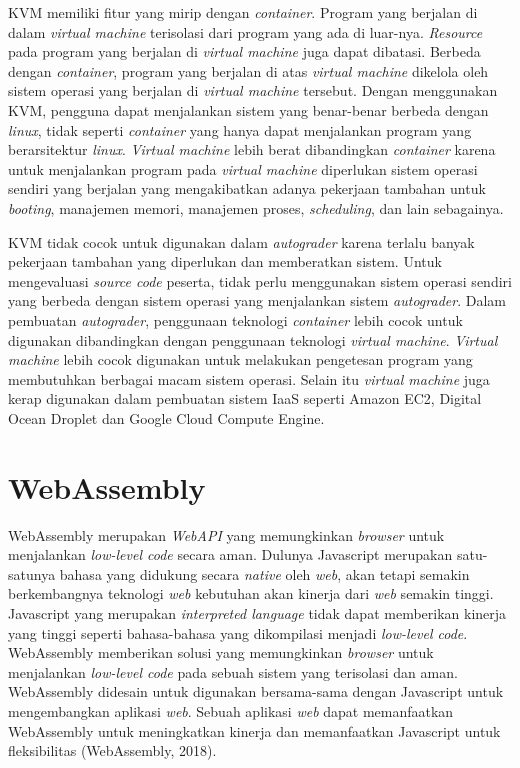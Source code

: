 \par KVM memiliki fitur yang mirip dengan \textit{container}. Program yang berjalan di dalam \textit{virtual machine} terisolasi dari program yang ada di luar-nya. \textit{Resource} pada program yang berjalan di \textit{virtual machine} juga dapat dibatasi. Berbeda dengan \textit{container}, program yang berjalan di atas \textit{virtual machine} dikelola oleh sistem operasi yang berjalan di \textit{virtual machine} tersebut. Dengan menggunakan KVM, pengguna dapat menjalankan sistem yang benar-benar berbeda dengan \textit{linux}, tidak seperti \textit{container} yang hanya dapat menjalankan program yang berarsitektur \textit{linux}. \textit{Virtual machine} lebih berat dibandingkan \textit{container} karena untuk menjalankan program pada \textit{virtual machine} diperlukan sistem operasi sendiri yang berjalan yang mengakibatkan adanya pekerjaan tambahan untuk \textit{booting}, manajemen memori, manajemen proses, \textit{scheduling}, dan lain sebagainya.

\par KVM tidak cocok untuk digunakan dalam \textit{autograder} karena terlalu banyak pekerjaan tambahan yang diperlukan dan memberatkan sistem. Untuk mengevaluasi \textit{source code} peserta, tidak perlu menggunakan sistem operasi sendiri yang berbeda dengan sistem operasi yang menjalankan sistem \textit{autograder}. Dalam pembuatan \textit{autograder}, penggunaan teknologi \textit{container} lebih cocok untuk digunakan dibandingkan dengan penggunaan teknologi \textit{virtual machine}. \textit{Virtual machine} lebih cocok digunakan untuk melakukan pengetesan program yang membutuhkan berbagai macam sistem operasi. Selain itu \textit{virtual machine} juga kerap digunakan dalam pembuatan sistem IaaS seperti Amazon EC2, Digital Ocean Droplet dan Google Cloud Compute Engine.

\section{WebAssembly}

\par WebAssembly merupakan \textit{WebAPI} yang memungkinkan \textit{browser} untuk menjalankan \textit{low-level code} secara aman. Dulunya Javascript merupakan satu-satunya bahasa yang didukung secara \textit{native} oleh \textit{web}, akan tetapi semakin berkembangnya teknologi \textit{web} kebutuhan akan kinerja dari \textit{web} semakin tinggi. Javascript yang merupakan \textit{interpreted language} tidak dapat memberikan kinerja yang tinggi seperti bahasa-bahasa yang dikompilasi menjadi \textit{low-level code}. WebAssembly memberikan solusi yang memungkinkan \textit{browser} untuk menjalankan \textit{low-level code} pada sebuah sistem yang terisolasi dan aman. WebAssembly didesain untuk digunakan bersama-sama dengan Javascript untuk mengembangkan aplikasi \textit{web}. Sebuah aplikasi \textit{web} dapat memanfaatkan WebAssembly untuk meningkatkan kinerja dan memanfaatkan Javascript untuk fleksibilitas (WebAssembly, 2018).

